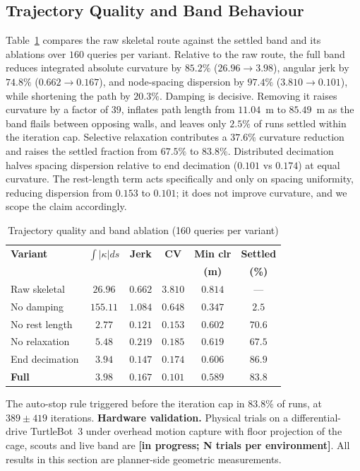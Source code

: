 \documentclass[conference]{IEEEtran}
\newcommand{\PH}[1]{{\color{red}\textbf{[#1]}}}
\begin{document}
\subsection{Trajectory Quality and Band Behaviour}
Table~\ref{tab:kinematics} compares the raw skeletal route against the settled band and its ablations over $160$ queries per variant. Relative to the raw route, the full band reduces integrated absolute curvature by $85.2\%$ ($26.96\rightarrow3.98$), angular jerk by $74.8\%$ ($0.662\rightarrow0.167$), and node-spacing dispersion by $97.4\%$ ($3.810\rightarrow0.101$), while shortening the path by $20.3\%$.
Damping is decisive. Removing it raises curvature by a factor of $39$, inflates path length from $11.04$~m to $85.49$~m as the band flails between opposing walls, and leaves only $2.5\%$ of runs settled within the iteration cap. Selective relaxation contributes a $37.6\%$ curvature reduction and raises the settled fraction from $67.5\%$ to $83.8\%$. Distributed decimation halves spacing dispersion relative to end decimation ($0.101$ vs $0.174$) at equal curvature.
The rest-length term acts specifically and only on spacing uniformity, reducing dispersion from $0.153$ to $0.101$; it does not improve curvature, and we scope the claim accordingly.
\begin{table}[htbp]
\caption{Trajectory quality and band ablation (160 queries per variant)}
\label{tab:kinematics}
\begin{center}
\begin{tabular}{@{}lccccc@{}}
\toprule
\textbf{Variant} & $\int|\kappa|ds$ & \textbf{Jerk} & \textbf{CV} & \textbf{Min clr} & \textbf{Settled} \\
 & & & & \textbf{(m)} & \textbf{(\%)} \\ \midrule
Raw skeletal & $26.96$ & $0.662$ & $3.810$ & $0.814$ & --- \\
No damping & $155.11$ & $1.084$ & $0.648$ & $0.347$ & $2.5$ \\
No rest length & $\mathbf{2.77}$ & $\mathbf{0.121}$ & $0.153$ & $0.602$ & $70.6$ \\
No relaxation & $5.48$ & $0.219$ & $0.185$ & $0.619$ & $67.5$ \\
End decimation & $3.94$ & $0.147$ & $0.174$ & $0.606$ & $\mathbf{86.9}$ \\
\textbf{Full} & $3.98$ & $0.167$ & $\mathbf{0.101}$ & $0.589$ & $83.8$ \\ \bottomrule
\end{tabular}
\end{center}
\end{table}
The auto-stop rule triggered before the iteration cap in $83.8\%$ of runs, at $389\pm419$ iterations.
\textbf{Hardware validation.} Physical trials on a differential-drive TurtleBot~3 under overhead motion capture with floor projection of the cage, scouts and live band are \PH{in progress; N trials per environment}. All results in this section are planner-side geometric measurements.
\end{document}
